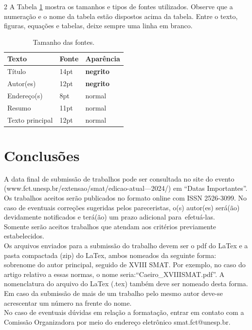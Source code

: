 \documentclass[12pt, a4paper]{article}
\begin{document}
\begin{multicols}{2}
\noindent  A Tabela \ref{tabela1} mostra os tamanhos e tipos de fontes utilizados. Observe que a numeração e o nome da tabela estão dispostos acima da tabela. Entre o texto, figuras, equações e tabelas, deixe sempre uma linha em branco.
\begin{table}[H]
\centering
\caption{Tamanho das fontes.}
{\footnotesize
\begin{tabular}{lll}
 \hline
Texto & Fonte & Aparência \\ 
\hline                              
Título & 14pt        & {\bf negrito} \\
Autor(es) & 12pt    & {\bf negrito} \\
Endereço(s) & 8pt              & normal \\
Resumo & 11pt       & normal \\
Texto principal & 12pt       & normal\\
\hline
\end{tabular}}
\label{tabela1}
\end{table}


\section{Conclusões}

\noindent A data final de submissão de trabalhos pode ser consultada no site do evento
(www.fct.unesp.br/extensao/smat/edicao-atual---2024/) em “Datas
Importantes”. Os trabalhos aceitos serão publicados no 
formato online com ISSN 2526-3099.
No caso de eventuais correções sugeridas 
pelos pareceristas, o(s) autor(es) será(ão) 
devidamente notificados e terá(ão) um 
prazo adicional para efetuá-las.
\\Somente serão aceitos trabalhos que atendam aos critérios previamente estabelecidos. 
\\Os arquivos enviados para a submissão do trabalho devem ser o pdf do LaTex e a pasta compactada (zip) do LaTex, ambos nomeados da seguinte forma: sobrenome do autor principal, seguido de XVIII SMAT. Por exemplo, no caso do artigo relativo a essas normas, o nome seria:\linebreak ``Caeiro\_XVIIISMAT.pdf''. A nomenclatura do arquivo do LaTex (.tex) também deve ser nomeado desta forma. Em caso da submissão de mais de um trabalho pelo mesmo autor deve-se acrescentar um número na frente do nome.
\\ No caso de eventuais dúvidas em relação a formatação, entrar em contato com a Comissão Organizadora por meio do endereço eletrônico smat.fct@unesp.br.


\end{multicols}
\end{document}
